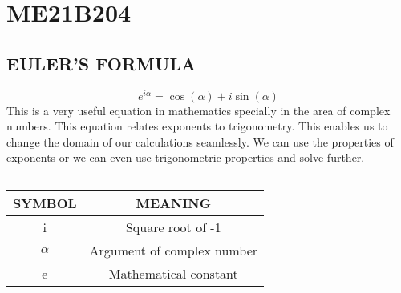 \section{ME21B204}

\subsection{EULER'S FORMULA}

$$e^{i\alpha} = \cos\left( \alpha \right) + i\sin\left( \alpha \right)$$
This is a very useful equation in mathematics specially in the area of complex numbers. This equation relates exponents to trigonometry. This enables us to change the domain of our calculations seamlessly. We can use the properties of exponents or we can even use trigonometric properties and solve further. 

$$$$

\begin{tabular}{|c|c|}
    \hline   
    SYMBOL & MEANING \\
    \hline
    i & Square root of -1\\
    \hline
    $\alpha$ & Argument of complex number\\
    \hline
    e & Mathematical constant\\
    \hline
\end{tabular}
